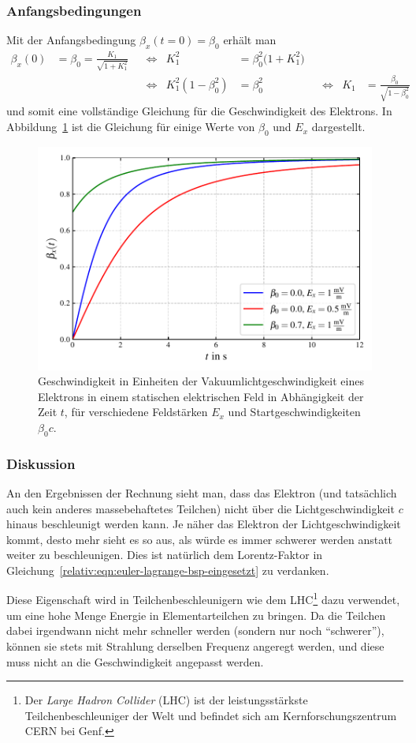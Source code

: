 \subsubsection{Anfangsbedingungen}
Mit der Anfangsbedingung \(\beta_x(t=0)=\beta_0\) erhält man
\begin{align*}
\beta_x(0)
&=
\beta_0 = \frac{K_1}{\sqrt{1+K_1^2}}
&
&\Leftrightarrow
&
K_1^2
&=
\beta_0^2 \bigl(1+K_1^2\bigr)
&
&&&
\\
&
&
&\Leftrightarrow
&
K_1^2 (1-\beta_0^2 )
&=
\beta_0^2 
&
&\Leftrightarrow
&
K_1
&=
\frac{\beta_0}{\sqrt{1-\beta_0^2 }}
\end{align*}
und somit eine vollständige Gleichung für die Geschwindigkeit des Elektrons.
In Abbildung~\ref{relativ:fig:elektron-em-feld} ist die Gleichung für einige
Werte von \(\beta_0\) und \(E_x\) dargestellt.
\begin{figure}
    \centering
    \includegraphics[width=0.8\linewidth]{papers/relativ/images/elektron_e-feld.pdf}
    \caption{Geschwindigkeit in Einheiten der Vakuumlichtgeschwindigkeit
    eines Elektrons in einem statischen elektrischen Feld in Abhängigkeit der Zeit \(t\),
    für verschiedene Feldstärken \(E_x\) und Startgeschwindigkeiten \(\beta_0 c\).
    \label{relativ:fig:elektron-em-feld}}
\end{figure}

\subsubsection{Diskussion}
An den Ergebnissen der Rechnung sieht man, dass das Elektron (und tatsächlich auch kein anderes
massebehaftetes Teilchen) nicht über die Lichtgeschwindigkeit \(c\) hinaus beschleunigt werden kann.
Je näher das Elektron der Lichtgeschwindigkeit kommt, desto mehr sieht es so aus,
als würde es immer schwerer werden anstatt weiter zu beschleunigen.
Dies ist natürlich dem Lorentz-Faktor in Gleichung~\eqref{relativ:eqn:euler-lagrange-bsp-eingesetzt}
zu verdanken.

Diese Eigenschaft wird in Teilchenbeschleunigern wie dem LHC\footnote{
%
%
Der \emph{Large Hadron Collider} (LHC) ist der leistungsstärkste
Teilchenbeschleuniger der Welt und befindet sich am
%
Kernforschungszentrum CERN bei Genf.
%
}
dazu verwendet, um eine hohe Menge Energie in Elementarteilchen zu bringen.
Da die Teilchen dabei irgendwann nicht mehr schneller werden
(sondern nur noch ``schwerer''),
können sie stets mit Strahlung derselben Frequenz angeregt werden, und
diese muss nicht an die Geschwindigkeit angepasst werden.
